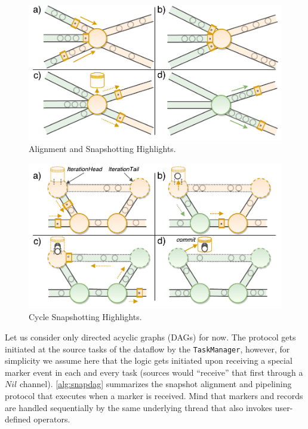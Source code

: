 \begin{figure}[t]
\centering
\includegraphics[width=\textwidth / 2]{figures/snapshots-highlights.pdf}
\caption{Alignment and Snapshotting Highlights.} 
\label{fig:snapshots-highlights}
\vspace{-4mm}
\end{figure}
\begin{figure}[t!]
\centering
\includegraphics[width=\textwidth / 2]{figures/cycle-highlights.pdf}
\caption{Cycle Snapshotting Highlights.} 
\label{fig:cycle-highlights}
\vspace{-4mm}
\end{figure}


Let us consider only directed acyclic graphs (DAGs) for now. The protocol gets initiated at the source tasks of the dataflow by the \texttt{TaskManager}, however, for simplicity we assume here that the logic gets initiated upon receiving a special marker event in each and every task (sources would ``receive'' that first through a $Nil$ channel). \autoref{alg:snapdag} summarizes the snapshot alignment and pipelining protocol that executes when a marker is received. Mind that markers and records are handled sequentially by the same underlying thread that also invokes user-defined operators. 


